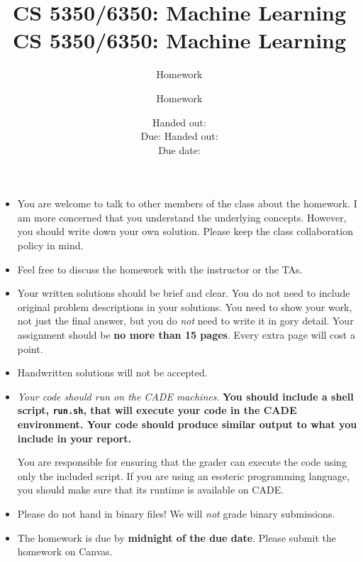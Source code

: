 \documentclass[12pt, fullpage,letterpaper]{article}
\title{CS 5350/6350: Machine Learning \semester}
\author{Homework \assignmentId}
\date{Handed out: \releaseDate\\
	Due: \dueDate}
\title{CS 5350/6350: Machine Learning \semester}
\author{Homework \assignmentId}
\date{Handed out: \releaseDate\\
  Due date: \dueDate}
\begin{document}
\maketitle


\newcommand{\Hcal}{\mathcal{H}} 
{\footnotesize
	\begin{itemize}
		\item You are welcome to talk to other members of the class about
		the homework. I am more concerned that you understand the
		underlying concepts. However, you should write down your own
		solution. Please keep the class collaboration policy in mind.
		
		\item Feel free to discuss the homework with the instructor or the TAs.
		
		\item Your written solutions should be brief and clear. You do not need to include original problem descriptions in your solutions. You need to
		show your work, not just the final answer, but you do \emph{not}
		need to write it in gory detail. Your assignment should be {\bf no
			more than 15 pages}. Every extra page will cost a point.
		
		\item Handwritten solutions will not be accepted.
		
		
		\item {\em Your code should run on the CADE machines}. \textbf{You should
		include a shell script, {\tt run.sh}, that will execute your code
		in the CADE environment. Your code should produce similar output to what you include in your report.}
		
		You are responsible for ensuring that the grader can execute the
		code using only the included script. If you are using an
		esoteric programming language, you should make sure that its
		runtime is available on CADE.
		
		\item Please do not hand in binary files! We will {\em not} grade
		binary submissions.
		
		\item The homework is due by \textbf{midnight of the due date}. Please submit
		the homework on Canvas.
		
	\end{itemize}
}
\end{document}
